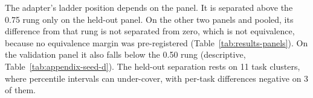 The adapter's ladder position depends on the panel. It is separated above the 0.75 rung only on the held-out panel. On the other two panels and pooled, its difference from that rung is not separated from zero, which is not equivalence, because no equivalence margin was pre-registered (Table~\ref{tab:results-panels}). On the validation panel it also falls below the 0.50 rung (descriptive, Table~\ref{tab:appendix-seed-d}). The held-out separation rests on 11 task clusters, where percentile intervals can under-cover, with per-task differences negative on 3 of them.

